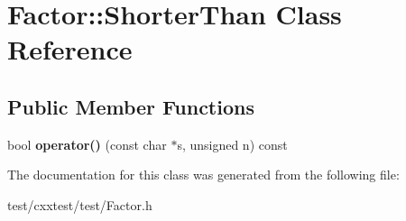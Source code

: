 \hypertarget{classFactor_1_1ShorterThan}{\section{Factor\-:\-:Shorter\-Than Class Reference}
\label{classFactor_1_1ShorterThan}
}
\subsection*{Public Member Functions}
\begin{DoxyCompactItemize}
\item 
\hypertarget{classFactor_1_1ShorterThan_a99d51f4ed2722f2089c758814dad6a26}{bool {\bfseries operator()} (const char $\ast$s, unsigned n) const }\label{classFactor_1_1ShorterThan_a99d51f4ed2722f2089c758814dad6a26}

\end{DoxyCompactItemize}


The documentation for this class was generated from the following file\-:\begin{DoxyCompactItemize}
\item 
test/cxxtest/test/Factor.\-h\end{DoxyCompactItemize}
